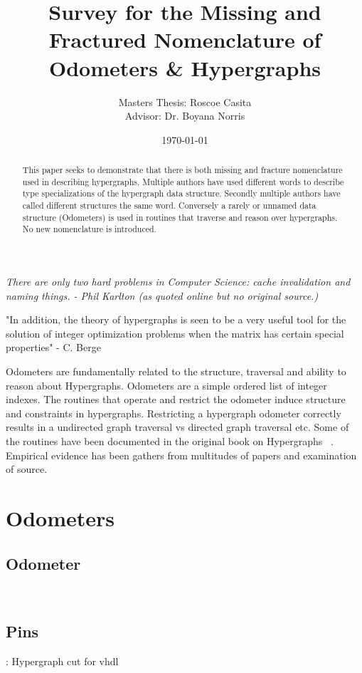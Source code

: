 \documentclass[10pt]{article}
\title{Survey for the Missing and Fractured Nomenclature of Odometers \& Hypergraphs}
\author{
        Masters Thesis: Roscoe Casita \\
        Advisor: Dr. Boyana Norris\\
}
\date{\today}
\begin{document}
\maketitle
\textit{
There are only two hard problems in Computer Science: cache invalidation and naming things. - Phil Karlton (as quoted online but no original source.)}

\begin{abstract}
	
	This paper seeks to demonstrate that there is both missing and fracture nomenclature used in describing hypergraphs. Multiple authors have used different words to describe type specializations of the hypergraph data structure. Secondly multiple authors have called different structures the same word. Conversely a rarely or unnamed data structure (Odometers) is used in routines that traverse and reason over hypergraphs. No new nomenclature is introduced.  
\end{abstract}

"In addition, the theory of hypergraphs is seen to be a very useful tool for the solution of integer optimization problems when the matrix has certain special properties" - C. Berge ~\cite{Hypergraph:Book}



Odometers are fundamentally related to the structure, traversal and ability to reason about Hypergraphs. Odometers are a simple ordered list of integer indexes. The routines that operate and restrict the odometer induce structure and constraints in hypergraphs. Restricting a hypergraph odometer correctly results in a undirected graph traversal vs directed graph traversal etc. Some of the routines have been documented in the original book on Hypergraphs ~\cite{Hypergraph:Book}. Empirical evidence has been gathers from multitudes of papers and examination of source. 

\newpage
\section{Odometers}
\subsection{Odometer}

~\cite{Odometer:Fuchs}
\subsection{Pins}:
Hypergraph cut for vhdl \\
\end{document}
